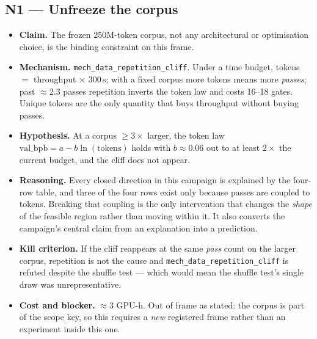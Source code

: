 \documentclass{article}
\newcommand{\vb}{\mathrm{val\_bpb}}
\begin{document}
\subsection{N1 --- Unfreeze the corpus}
\begin{itemize}
\item \textbf{Claim.} The frozen 250M-token corpus, not any architectural or optimisation choice, is the binding constraint on this frame.
\item \textbf{Mechanism.} \texttt{mech\_data\_repetition\_cliff}. Under a time budget, tokens $=$ throughput $\times$ 300\,s; with a fixed corpus more tokens means more \emph{passes}; past $\approx$2.3 passes repetition inverts the token law and costs 16--18 gates. Unique tokens are the only quantity that buys throughput without buying passes.
\item \textbf{Hypothesis.} At a corpus $\ge 3\times$ larger, the token law $\vb = a - b\ln(\text{tokens})$ holds with $b\approx0.06$ out to at least $2\times$ the current budget, and the cliff does not appear.
\item \textbf{Reasoning.} Every closed direction in this campaign is explained by the four-row table, and three of the four rows exist only because passes are coupled to tokens. Breaking that coupling is the only intervention that changes the \emph{shape} of the feasible region rather than moving within it. It also converts the campaign's central claim from an explanation into a prediction.
\item \textbf{Kill criterion.} If the cliff reappears at the same \emph{pass} count on the larger corpus, repetition is not the cause and \texttt{mech\_data\_repetition\_cliff} is refuted despite the shuffle test --- which would mean the shuffle test's single draw was unrepresentative.
\item \textbf{Cost and blocker.} $\approx$3 GPU-h. Out of frame as stated: the corpus is part of the scope key, so this requires a \emph{new} registered frame rather than an experiment inside this one.
\end{itemize}
\end{document}
